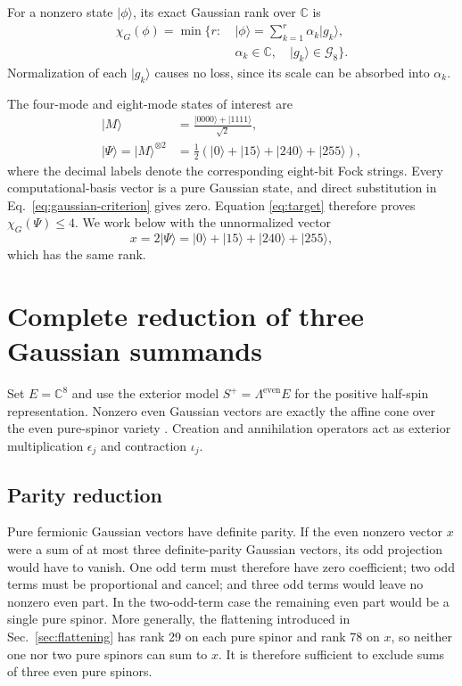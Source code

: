 \documentclass[aps,pra,reprint,groupedaddress,nofootinbib,longbibliography]{revtex4-2}
\newcommand{\ket}[1]{\lvert #1\rangle}
\newcommand{\C}{\mathbb{C}}
\newcommand{\G}{\mathcal{G}}
\begin{document}
For a nonzero state $\ket\phi$, its exact Gaussian rank over $\C$ is
\begin{equation}
 \begin{split}
 \chi_G(\phi)=\min\biggl\{r:\ &\ket\phi=\sum_{k=1}^r\alpha_k\ket{g_k},\\
 &\alpha_k\in\C,\quad \ket{g_k}\in\G_8\biggr\}.
 \end{split}
 \label{eq:rank-def}
\end{equation}
Normalization of each $\ket{g_k}$ causes no loss, since its scale can be
absorbed into $\alpha_k$.

The four-mode and eight-mode states of interest are
\begin{align}
 \ket M&=\frac{\ket{0000}+\ket{1111}}{\sqrt2},\\
 \ket\Psi=\ket M^{\otimes2}
 &=\frac12(\ket0+\ket{15}+\ket{240}+\ket{255}),
 \label{eq:target}
\end{align}
where the decimal labels denote the corresponding eight-bit Fock strings.
Every computational-basis vector is a pure Gaussian state, and direct
substitution in Eq.~\eqref{eq:gaussian-criterion} gives zero.  Equation
\eqref{eq:target} therefore proves $\chi_G(\Psi)\le4$.  We work below with the
unnormalized vector
\begin{equation}
 x=2\ket\Psi=\ket0+\ket{15}+\ket{240}+\ket{255},
 \label{eq:x}
\end{equation}
which has the same rank.

\section{Complete reduction of three Gaussian summands}
\label{sec:reduction}

Set $E=\C^8$ and use the exterior model
$S^+=\Lambda^{\mathrm{even}}E$ for the positive half-spin representation.
Nonzero even Gaussian vectors are exactly the affine cone over the even
pure-spinor variety \cite{Chevalley1954}.  Creation and annihilation operators
act as exterior multiplication $\epsilon_j$ and contraction $\iota_j$.

\subsection{Parity reduction}

Pure fermionic Gaussian vectors have definite parity.  If the even nonzero
vector $x$ were a sum of at most three definite-parity Gaussian vectors, its odd
projection would have to vanish.  One odd term must therefore have zero
coefficient; two odd terms must be proportional and cancel; and three odd terms
would leave no nonzero even part.  In the two-odd-term case the remaining even
part would be a single pure spinor.  More generally, the flattening introduced
in Sec.~\ref{sec:flattening} has rank 29 on each pure spinor and rank 78 on $x$,
so neither one nor two pure spinors can sum to $x$.  It is therefore sufficient
to exclude sums of three even pure spinors.
\end{document}

